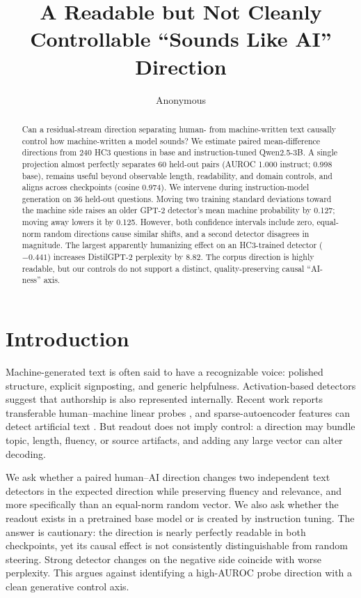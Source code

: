\documentclass[10pt,twocolumn]{article}
\title{A Readable but Not Cleanly Controllable ``Sounds Like AI'' Direction}
\author{Anonymous}\date{}
\newcommand{\model}{Qwen2.5-3B}
\begin{document}
\maketitle
\begin{abstract}
Can a residual-stream direction separating human- from machine-written text causally control how machine-written a model sounds? We estimate paired mean-difference directions from 240 HC3 questions in base and instruction-tuned \model. A single projection almost perfectly separates 60 held-out pairs (AUROC 1.000 instruct; 0.998 base), remains useful beyond observable length, readability, and domain controls, and aligns across checkpoints (cosine 0.974). We intervene during instruction-model generation on 36 held-out questions. Moving two training standard deviations toward the machine side raises an older GPT-2 detector's mean machine probability by 0.127; moving away lowers it by 0.125. However, both confidence intervals include zero, equal-norm random directions cause similar shifts, and a second detector disagrees in magnitude. The largest apparently humanizing effect on an HC3-trained detector ($-0.441$) increases DistilGPT-2 perplexity by 8.82. The corpus direction is highly readable, but our controls do not support a distinct, quality-preserving causal ``AI-ness'' axis.
\end{abstract}

\section{Introduction}
Machine-generated text is often said to have a recognizable voice: polished structure, explicit signposting, and generic helpfulness. Activation-based detectors suggest that authorship is also represented internally. Recent work reports transferable human--machine linear probes \citep{quaremba2026linear,svdetect2026}, and sparse-autoencoder features can detect artificial text \citep{kuznetsov2025feature}. But readout does not imply control: a direction may bundle topic, length, fluency, or source artifacts, and adding any large vector can alter decoding.

We ask whether a paired human--AI direction changes two independent text detectors in the expected direction while preserving fluency and relevance, and more specifically than an equal-norm random vector. We also ask whether the readout exists in a pretrained base model or is created by instruction tuning. The answer is cautionary: the direction is nearly perfectly readable in both checkpoints, yet its causal effect is not consistently distinguishable from random steering. Strong detector changes on the negative side coincide with worse perplexity. This argues against identifying a high-AUROC probe direction with a clean generative control axis.
\end{document}
